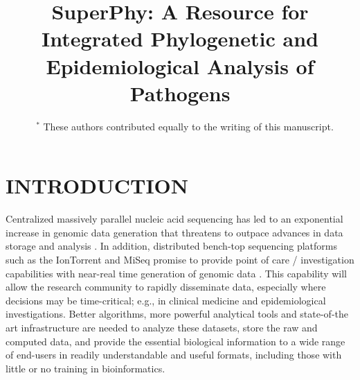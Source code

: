 \documentclass[a4paper,twoside]{article}
\begin{document}
\title{SuperPhy: A Resource for Integrated Phylogenetic and Epidemiological Analysis of Pathogens}

\author{
\ \
$^{*}$ These authors contributed equally to the writing of this manuscript.}



\onecolumn \maketitle \normalsize \vfill

\section{\uppercase{Introduction}}
\label{sec:introduction}

\noindent Centralized massively parallel nucleic acid sequencing has led to an exponential increase in genomic data generation that threatens to outpace advances in data storage and analysis \cite{kahn_future_2011,teeling_current_2012}. In addition, distributed bench-top sequencing platforms such as the IonTorrent and MiSeq promise to provide point of care / investigation capabilities with near-real time generation of genomic data \cite{loman_performance_2012}. This capability will allow the research community to rapidly disseminate data, especially where decisions may be time-critical; e.g., in clinical medicine and epidemiological investigations. Better algorithms, more powerful analytical tools and state-of-the art infrastructure are needed to analyze these datasets, store the raw and computed data, and provide the essential biological information to a wide range of end-users in readily understandable and useful formats, including those with little or no training in bioinformatics.
\end{document}
